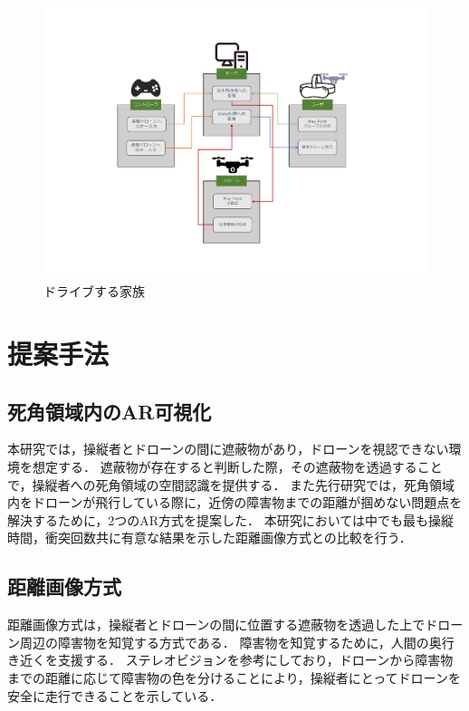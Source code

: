 \documentclass[a4paper,10pt,twocolumn,uplatex]{jsarticle}
\begin{document}
\begin{figure}[!tb]
  \centering
  \includegraphics[width=\linewidth]{img/overview.pdf}
  \caption{ドライブする家族}
  \label{fig:sample2}
\end{figure}


\section{提案手法}\label{discussion}
\subsection{死角領域内のAR可視化}
本研究では，操縦者とドローンの間に遮蔽物があり，ドローンを視認できない環境を想定する．
遮蔽物が存在すると判断した際，その遮蔽物を透過することで，操縦者への死角領域の空間認識を提供する．
また先行研究では，死角領域内をドローンが飛行している際に，近傍の障害物までの距離が掴めない問題点を解決するために，2つのAR方式を提案した．
本研究においては中でも最も操縦時間，衝突回数共に有意な結果を示した距離画像方式との比較を行う．

\subsection{距離画像方式}
距離画像方式は，操縦者とドローンの間に位置する遮蔽物を透過した上でドローン周辺の障害物を知覚する方式である．
障害物を知覚するために，人間の奥行き近くを支援する．
ステレオビジョンを参考にしており，ドローンから障害物までの距離に応じて障害物の色を分けることにより，操縦者にとってドローンを安全に走行できることを示している．
\end{document}
